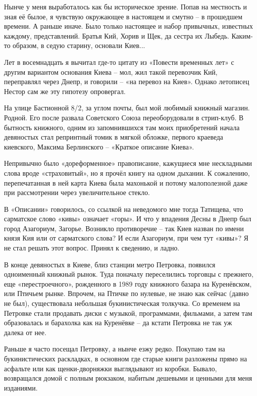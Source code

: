 Нынче у меня выработалось как бы историческое зрение. Попав на местность и зная её былое, я чувствую окружающее в настоящем и смутно – в прошедшем времени. А раньше иначе. Было только настоящее и набор привычных, известных каждому, представлений. Братья Кий, Хорив и Щек, да сестра их Лыбедь. Каким-то образом, в седую старину, основали Киев...

Лет в восемнадцать я вычитал где-то цитату из «Повести временных лет» с другим вариантом основания Киева – мол, жил такой перевозчик Кий, переправлял через Днепр, и говорили – «на перевоз на Киев». Однако летописец Нестор сам же эту гипотезу опровергал.

На улице Бастионной 8/2, за углом почты, был мой любимый книжный магазин. Родной. Его после развала Советского Союза переоборудовали в стрип-клуб. В бытность книжного, одним из запомнившихся там моих приобретений начала девяностых стал репринтный томик в мягкой обложке, первого краеведа киевского, Максима Берлинского – «Краткое описание Киева».

Непривычно было «дореформенное» правописание, кажущиеся мне нескладными слова вроде «страховитый», но я прочёл книгу на одном дыхании. К сожалению, перепечатанная в ней карта Киева была махонькой и потому малополезной даже при рассмотрении через увеличительное стекло.

В «Описании» говорилось, со ссылкой на неведомого мне тогда Татищева, что сарматское слово «кивы» означает «горы». И что у впадения Десны в Днепр был город Азагориум, Загорье. Возникло противоречие – так Киев назван по имени князя Кия или от сарматского слова? И если Азагориум, при чем тут «кивы»? Я не стал решать этот вопрос. Принял к сведению, и ладно.

В конце девяностых в Киеве, близ станции метро Петровка, появился одноименный книжный рынок. Туда поначалу переселились торговцы с прежнего, еще «перестроечного», рожденного в 1989 году книжного базара на Куренёвском, или Птичьем рынке. Впрочем, на Птичке по нулевые, не знаю как сейчас (давно не был), существовала небольшая букинистическая толкучка. Со временем на Петровке стали продавать диски с музыкой, программами, фильмами, а затем там образовалась и барахолка как на Куренёвке – да кстати Петровка не так уж далека от нее.

Раньше я часто посещал Петровку, а нынче езжу редко. Покупаю там на букинистических раскладках, в основном где старые книги разложены прямо на асфальте или как щенки-дворняжки выглядывают из коробки. Бывало, возвращался домой с полным рюкзаком, набитым дешевыми и ценными для меня изданиями.

